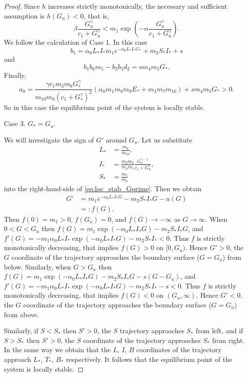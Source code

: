 \documentclass[pdflatex,sn-mathphys-num]{sn-jnl}
\theoremstyle{thmstyleone}
\theoremstyle{thmstyletwo}
\theoremstyle{thmstylethree}
\begin{document}
\begin{proof}
Since $h$ increases strictly monotonically, the necessary and sufficient assumption is $h(G_u)<0$, that is,
\begin{equation}
\beta\frac{G_u^{\gamma}}{c_1+G_u^{\gamma}}<m_1\exp\left(-\alpha \frac{G_u^{\gamma}}{c_1+G_u^{\gamma}}  \right).
\end{equation}
We follow the calculation of Case 1. In this case 
\begin{equation*}
b_1 =\alpha_0 L_{*} I_{*} m_1 e^{-\alpha_0 L_{*} I_{*} G_{*}} + m_2 S_{*} I_{*}+s
\end{equation*}
and 
\begin{equation*}
b_1b_6m_5-b_2b_5d_2=sm_4m_5G_{*}.
\end{equation*}
Finally,
\begin{equation}
a_0=\frac{\gamma c_1 m_3 m_6 G_{*}^{\gamma}}{m_{10}m_8 (c_1+G_{*}^{\gamma})^2}(\alpha_0 m_1m_8m_9E_{*}+m_2m_7m_{10})+sm_4m_5G_{*}>0.
\end{equation}
So in this case the equilibrium point of the system is locally stable.

Case 3. $G_{*}=G_u$. 

We will investigate the sign of $G'$ around $G_u$. 
Let us substitute 
\begin{align*}
L_{*} &= \frac{m_9}{m_{10}}, \\
I_{*} &= \frac{m_3m_6}{m_4m_5}\frac{G_u^{\gamma -1}}{c_1+G_u^{\gamma}}, \\
S_{*} &= \frac{m_7}{m_8}
\end{align*}
into the right-hand-side of \eqref{eq:loc_stab_Gprime}. 
Then we obtain
\begin{align*}
G' &=m_1 e^{-\alpha_0 L_{*}I_{*}G} -m_2 S_{*}I_{*}G-u(G) \\
&=:f(G).
\end{align*}
Then $f(0)=m_1>0$, $f(G_u)=0$, and $f(G)\to -\infty$ as $G\to\infty$. When $0<G<G_u$ 
then $f(G)=m_1 \exp\left(-\alpha_0 L_{*}I_{*}G\right) -m_2 S_{*}I_{*}G$, 
and $f'(G)=-m_1 \alpha_0 L_{*}I_{*} \exp\left(-\alpha_0 L_{*}I_{*}G\right) -m_2 S_{*}I_{*}<0$. 
Thus $f$ is strictly monotonically decreasing, that implies $f(G)>0$ on $[0,G_u)$. 
Hence $G'>0$, the $G$ coordinate of the 
trajectory approaches the boundary surface ($G=G_u$) from below. Similarly, 
when $G>G_u$ then $f(G)=m_1 \exp\left(-\alpha_0 L_{*}I_{*}G\right) -m_2 S_{*}I_{*}G-s(G-G_u)$, and 
$f'(G)=-m_1 \alpha_0 L_{*}I_{*} \exp\left(-\alpha_0 L_{*}I_{*}G\right) -m_2 S_{*}I_{*}-s<0$.
Thus $f$ is strictly monotonically decreasing, that implies $f(G)<0$ on $(G_u,\infty)$. 
Hence $G'<0$, the $G$ coordinate of the trajectory approaches the boundary surface ($G=G_u$) from above.

Similarly, if $S<S_{*}$ then $S'>0$, the $S$ trajectory approaches $S_{*}$ from left, 
and if $S>S_{*}$ then $S'>0$, the $S$ coordinate of the trajectory approaches $S_{*}$ from right. 
In the same way we obtain that the $L$, $I$, $B$ coordinates of the trajectory approach 
$L_{*}$, $T_{*}$, $B_{*}$ respectively.   It follows that the equilibrium point of the system is locally stable. 
\end{proof}
\end{document}
